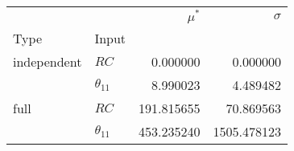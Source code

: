 \begin{tabular}{llrr}
\toprule
     &               &  $\mu^\ast$ &     $\sigma$ \\
Type & Input &             &              \\
\midrule
independent & $RC$ &    0.000000 &     0.000000 \\
     & $\theta_{11}$ &    8.990023 &     4.489482 \\
full & $RC$ &  191.815655 &    70.869563 \\
     & $\theta_{11}$ &  453.235240 &  1505.478123 \\
\bottomrule
\end{tabular}
